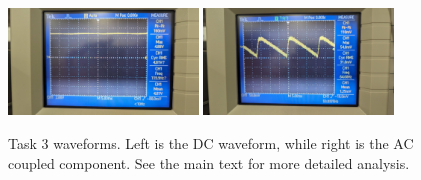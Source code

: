 \documentclass[letterpaper, reqno,11pt]{article}
\begin{document}
\begin{figure}[htpb]
        \centering
        \includegraphics[width=0.45\textwidth]{lab1/t3a}
        \includegraphics[width=0.45\textwidth]{lab1/t3b}
        \caption{Task 3 waveforms. Left is the DC waveform, while right is the AC coupled component. See the main text for more detailed analysis.}
        \label{fig:t3w}
\end{figure}
\end{document}

